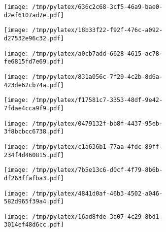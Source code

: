\documentclass{article}
\begin{document}
\begin{figure}[htbp]
\begin{subfigure}[b]{.3\linewidth}
\texttt{[image: /tmp/pylatex/636c2c68-3cf5-46a9-bae0-d2ef6107ad7e.pdf]}
\end{subfigure}
\begin{subfigure}[b]{.3\linewidth}
\texttt{[image: /tmp/pylatex/18b33f22-f92f-476c-a092-d27532e96c32.pdf]}
\end{subfigure}
\begin{subfigure}[b]{.3\linewidth}
\texttt{[image: /tmp/pylatex/a0cb7add-6628-4615-ac78-fe6815fd7e69.pdf]}
\end{subfigure}
\begin{subfigure}[b]{.3\linewidth}
\texttt{[image: /tmp/pylatex/831a056c-7f29-4c2b-8d6a-423de62cb74a.pdf]}
\end{subfigure}
\begin{subfigure}[b]{.3\linewidth}
\texttt{[image: /tmp/pylatex/f17581c7-3353-48df-9e42-7fdae4cca9f9.pdf]}
\end{subfigure}
\begin{subfigure}[b]{.3\linewidth}
\texttt{[image: /tmp/pylatex/0479132f-bb8f-4437-95eb-3f8bcbcc6738.pdf]}
\end{subfigure}
\begin{subfigure}[b]{.3\linewidth}
\texttt{[image: /tmp/pylatex/c1a636b1-77aa-4fdc-89ff-234f4d460815.pdf]}
\end{subfigure}
\begin{subfigure}[b]{.3\linewidth}
\texttt{[image: /tmp/pylatex/7b5e13c6-d0cf-4f79-8b6b-df263ffafba3.pdf]}
\end{subfigure}
\begin{subfigure}[b]{.3\linewidth}
\texttt{[image: /tmp/pylatex/4841d0af-46b3-4502-a046-582d965f39a4.pdf]}
\end{subfigure}
\begin{subfigure}[b]{.3\linewidth}
\texttt{[image: /tmp/pylatex/16ad8fde-3a07-4c29-8bd1-3014ef48d6cc.pdf]}
\end{subfigure}
\end{figure}
\end{document}
